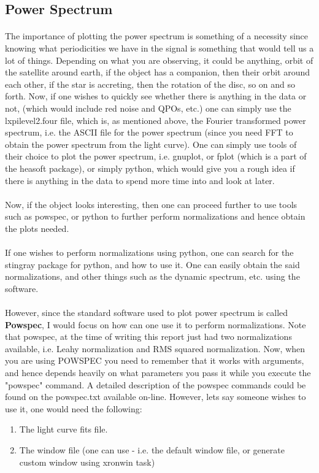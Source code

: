 \documentclass[a4paper,twoside]{report}
\numberwithin{equation}{section}
\begin{document}
\subsection{Power Spectrum}
\paragraph{}
The importance of plotting the power spectrum is something of a necessity since knowing what periodicities we have in the signal is something that would tell us a lot of things. Depending on what you are observing, it could be anything, orbit of the satellite around earth, if the object has a companion, then their orbit around each other, if the star is accreting, then the rotation of the disc, so on and so forth. Now, if one wishes to quickly see whether there is anything in the data or not, (which would include red noise and QPOs, etc.) one can simply use the lxpilevel2.four file, which is, as mentioned above, the Fourier transformed power spectrum, i.e. the ASCII file for the power spectrum (since you need FFT to obtain the power spectrum from the light curve). One can simply use tools of their choice to plot the power spectrum, i.e. gnuplot, or fplot (which is a part of the heasoft package), or simply python, which would give you a rough idea if there is anything in the data to spend more time into and look at later. 
\paragraph{}
Now, if the object looks interesting, then one can proceed further to use tools such as powspec, or python to further perform normalizations and hence obtain the plots needed. 
\paragraph{}
If one wishes to perform normalizations using python, one can search for the stingray package for python, and how to use it. One can easily obtain the said normalizations, and other things such as the dynamic spectrum, etc. using the software. 
\paragraph{}
However, since the standard software used to plot power spectrum is called \textbf{Powspec}, I would focus on how can one use it to perform normalizations. Note that powspec, at the time of writing this report just had two normalizations available, i.e. Leahy normalization and RMS squared normalization. Now, when you are using POWSPEC you need to remember that it works with arguments, and hence depends heavily on what parameters you pass it while you execute the "powspec" command. A detailed description of the powspec commands could be found on the powspec.txt available on-line. However, lets say someone wishes to use it, one would need the following: 
\begin{enumerate}
\item The light curve fits file. 
\item The window file (one can use - i.e. the default window file, or generate custom window using xronwin task)
\end{enumerate}
\end{document}
